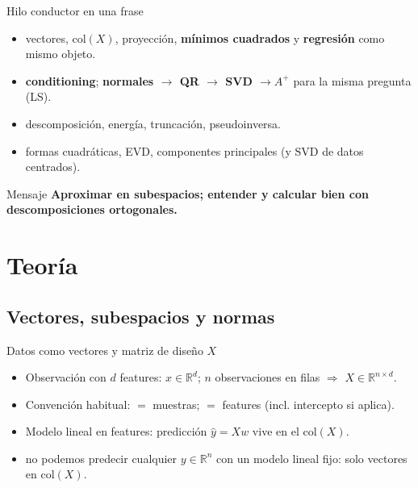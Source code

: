 \begin{frame}{Hilo conductor en una frase}
\begin{itemize}
  \item {} vectores, \(\mathrm{col}(X)\), proyección, \textbf{mínimos cuadrados} y \textbf{regresión} como mismo objeto.
  \item {} \textbf{conditioning}; \textbf{normales \(\rightarrow\) QR \(\rightarrow\) SVD \(\rightarrow A^+\)} para la misma pregunta (LS).
  \item {} descomposición, energía, truncación, pseudoinversa.
  \item {} formas cuadráticas, EVD, componentes principales (y SVD de datos centrados).
\end{itemize}
\vspace{0.4em}
\begin{block}{Mensaje}
\centering
\textbf{Aproximar en subespacios; entender y calcular bien con descomposiciones ortogonales.}
\end{block}
\end{frame}

\section[Teoría]{Teoría\label{sec:teoria-w07}}

\subsection{Vectores, subespacios y normas}

\begin{frame}{Datos como vectores y matriz de diseño \(X\)}
\begin{itemize}\small
  \item Observación con \(d\) features: \(x\in\mathbb{R}^d\); \(n\) observaciones en filas \(\Rightarrow\) \(X\in\mathbb{R}^{n\times d}\).
  \item Convención habitual:  \(=\) muestras;  \(=\) features (incl. intercepto si aplica).
  \item Modelo lineal en features: predicción \( \hat y = Xw\) vive en el  \(\mathrm{col}(X)\).
  \item {} no podemos predecir cualquier \(y\in\mathbb{R}^n\) con un modelo lineal fijo: solo vectores en \(\mathrm{col}(X)\).
\end{itemize}
\end{frame}

